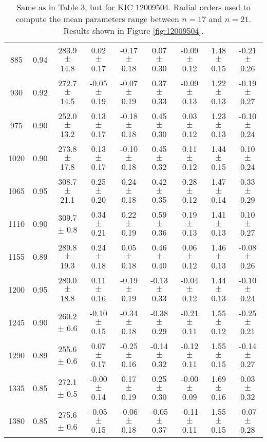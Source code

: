 \documentclass[twocolumn]{aastex61}%
\begin{document}
\begin{table*}[ht]
\begin{tabular}{ccc|ccccc|c}
885 & 0.94 & 283.9 $\pm$ 14.8 & 0.02 $\pm$ 0.17 & -0.17 $\pm$ 0.18 & 0.07 $\pm$ 0.30 & -0.09 $\pm$ 0.12 & 1.48 $\pm$ 0.15 & -0.21 $\pm$ 0.26\\
930 & 0.92 & 272.7 $\pm$ 14.5 & -0.05 $\pm$ 0.19 & -0.07 $\pm$ 0.19 & 0.37 $\pm$ 0.33 & -0.09 $\pm$ 0.13 & 1.22 $\pm$ 0.13 & -0.19 $\pm$ 0.27\\
975 & 0.90 & 252.0 $\pm$ 13.2 & 0.13 $\pm$ 0.17 & -0.18 $\pm$ 0.18 & 0.45 $\pm$ 0.30 & 0.03 $\pm$ 0.12 & 1.23 $\pm$ 0.13 & -0.10 $\pm$ 0.24\\
1020 & 0.90 & 273.8 $\pm$ 17.8 & 0.13 $\pm$ 0.17 & -0.10 $\pm$ 0.18 & 0.45 $\pm$ 0.32 & 0.11 $\pm$ 0.12 & 1.44 $\pm$ 0.15 & 0.10 $\pm$ 0.24\\
1065 & 0.95 & 308.7 $\pm$ 21.1 & 0.25 $\pm$ 0.20 & 0.24 $\pm$ 0.18 & 0.42 $\pm$ 0.35 & 0.28 $\pm$ 0.12 & 1.47 $\pm$ 0.14 & 0.33 $\pm$ 0.29\\
1110 & 0.90 & 309.7 $\pm$ 0.8 & 0.34 $\pm$ 0.21 & 0.22 $\pm$ 0.19 & 0.59 $\pm$ 0.36 & 0.19 $\pm$ 0.13 & 1.41 $\pm$ 0.13 & 0.10 $\pm$ 0.27\\
1155 & 0.89 & 289.8 $\pm$ 19.3 & 0.24 $\pm$ 0.18 & 0.05 $\pm$ 0.18 & 0.46 $\pm$ 0.40 & 0.06 $\pm$ 0.12 & 1.46 $\pm$ 0.13 & -0.08 $\pm$ 0.26\\
1200 & 0.95 & 280.0 $\pm$ 18.8 & 0.11 $\pm$ 0.16 & -0.19 $\pm$ 0.19 & -0.13 $\pm$ 0.33 & -0.04 $\pm$ 0.12 & 1.44 $\pm$ 0.13 & -0.10 $\pm$ 0.24\\
1245 & 0.90 & 260.2 $\pm$ 6.6 & -0.10 $\pm$ 0.15 & -0.34 $\pm$ 0.18 & -0.38 $\pm$ 0.29 & -0.21 $\pm$ 0.11 & 1.55 $\pm$ 0.12 & -0.25 $\pm$ 0.21\\
1290 & 0.89 & 255.6 $\pm$ 0.6 & 0.07 $\pm$ 0.17 & -0.25 $\pm$ 0.16 & -0.14 $\pm$ 0.32 & -0.12 $\pm$ 0.11 & 1.55 $\pm$ 0.15 & -0.14 $\pm$ 0.27\\
1335 & 0.85 & 272.1 $\pm$ 0.5 & -0.00 $\pm$ 0.14 & 0.17 $\pm$ 0.19 & 0.25 $\pm$ 0.30 & -0.00 $\pm$ 0.09 & 1.69 $\pm$ 0.16 & 0.03 $\pm$ 0.32\\
1380 & 0.85 & 275.6 $\pm$ 0.6 & -0.05 $\pm$ 0.15 & -0.06 $\pm$ 0.18 & -0.05 $\pm$ 0.37 & -0.11 $\pm$ 0.11 & 1.55 $\pm$ 0.15 & -0.07 $\pm$ 0.28\\
\end{tabular}
\caption{Same as in Table 3, but for KIC 12009504. Radial orders used to compute the mean parameters range between $n=17$ and $n=21$. Results shown in Figure \ref{fig:12009504}.}\label{tab:12009504}
\end{table*}
\end{document}

